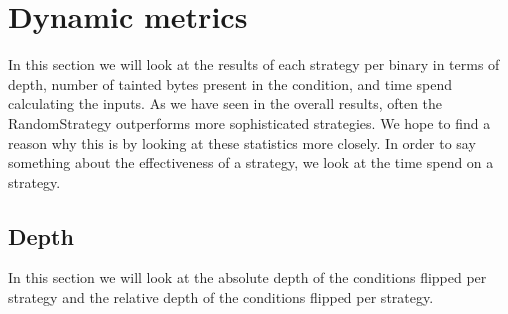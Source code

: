 \section{Dynamic metrics}
In this section we will look at the results of each strategy per binary in terms of depth, number of tainted bytes present in the condition, and time spend calculating the inputs. 
As we have seen in the overall results, often the RandomStrategy outperforms more sophisticated strategies. We hope to find a reason why this is by looking at these statistics more closely. 
In order to say something about the effectiveness of a strategy, we look at the time spend on a strategy. 

\subsection{Depth}
In this section we will look at the absolute depth of the conditions flipped per strategy and the relative depth of the conditions flipped per strategy.
